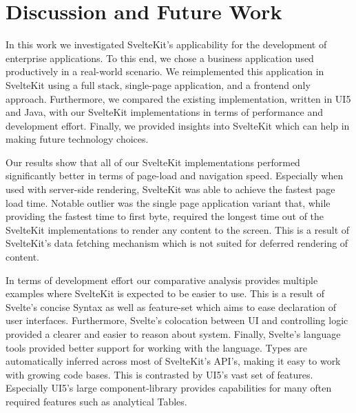 \chapter{Discussion and Future Work}
\label{ch:discussion}




In this work we investigated SvelteKit's applicability for the development of enterprise applications. To this end, we chose a business application used productively in a real-world scenario. We reimplemented this application in SvelteKit using a full stack, single-page application, and a frontend only approach. Furthermore, we compared the existing implementation, written in UI5 and Java, with our SvelteKit implementations in terms of performance and development effort. Finally, we provided insights into SvelteKit which can help in making future technology choices.

Our results show that all of our SvelteKit implementations performed significantly better in terms of page-load and navigation speed. Especially when used with server-side rendering, SvelteKit was able to achieve the fastest page load time. Notable outlier was the single page application variant that, while providing the fastest time to first byte, required the longest time out of the SvelteKit implementations to render any content to the screen. This is a result of SvelteKit's data fetching mechanism which is not suited for deferred rendering of content.

In terms of development effort our comparative analysis provides multiple examples where SvelteKit is expected to be easier to use. This is a result of Svelte's concise Syntax as well as feature-set which aims to ease declaration of user interfaces. Furthermore, Svelte's colocation between UI and controlling logic provided a clearer and easier to reason about system. Finally, Svelte's language tools provided better support for working with the language. Types are automatically inferred across most of SvelteKit's API's, making it easy to work with growing code bases. This is contrasted by UI5's vast set of features. Especially UI5's large component-library provides capabilities for many often required features such as analytical Tables. 

